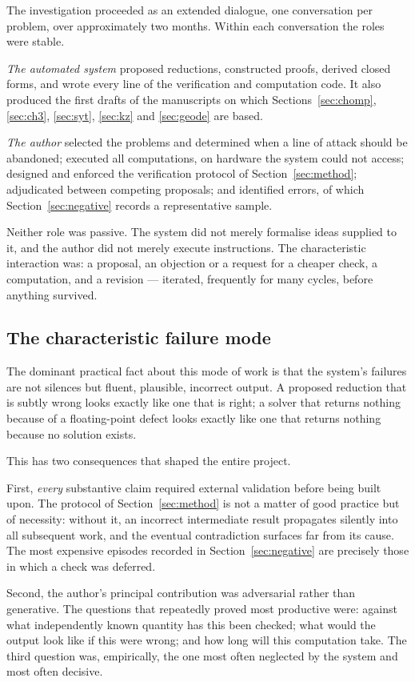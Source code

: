 \documentclass[11pt]{article}
\theoremstyle{definition}
\begin{document}
The investigation proceeded as an extended dialogue, one conversation per
problem, over approximately two months. Within each conversation the roles were
stable.

\emph{The automated system} proposed reductions, constructed proofs, derived
closed forms, and wrote every line of the verification and computation code. It
also produced the first drafts of the manuscripts on which
Sections~\ref{sec:chomp}, \ref{sec:ch3}, \ref{sec:syt}, \ref{sec:kz} and
\ref{sec:geode} are based.

\emph{The author} selected the problems and determined when a line of attack
should be abandoned; executed all computations, on hardware the system could
not access; designed and enforced the verification protocol of
Section~\ref{sec:method}; adjudicated between competing proposals; and
identified errors, of which Section~\ref{sec:negative} records a representative
sample.

Neither role was passive. The system did not merely formalise ideas supplied to
it, and the author did not merely execute instructions. The characteristic
interaction was: a proposal, an objection or a request for a cheaper check, a
computation, and a revision --- iterated, frequently for many cycles, before
anything survived.

\subsection{The characteristic failure mode}

The dominant practical fact about this mode of work is that the system's
failures are not silences but fluent, plausible, incorrect output. A proposed
reduction that is subtly wrong looks exactly like one that is right; a solver
that returns nothing because of a floating-point defect looks exactly like one
that returns nothing because no solution exists.

This has two consequences that shaped the entire project.

First, \emph{every} substantive claim required external validation before being
built upon. The protocol of Section~\ref{sec:method} is not a matter of good
practice but of necessity: without it, an incorrect intermediate result
propagates silently into all subsequent work, and the eventual contradiction
surfaces far from its cause. The most expensive episodes recorded in
Section~\ref{sec:negative} are precisely those in which a check was deferred.

Second, the author's principal contribution was adversarial rather than
generative. The questions that repeatedly proved most productive were: against
what independently known quantity has this been checked; what would the output
look like if this were wrong; and how long will this computation take. The
third question was, empirically, the one most often neglected by the system and
most often decisive.
\end{document}
